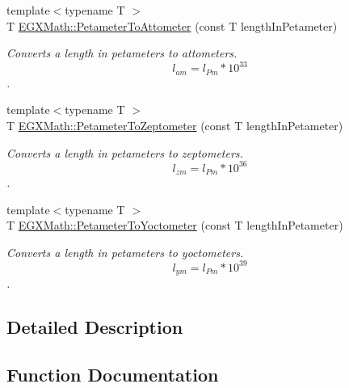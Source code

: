 \begin{DoxyCompactItemize}
{\footnotesize template$<$typename T $>$ }\\T \mbox{\hyperlink{group___e_g_x_math-_conversions-_length_conversions-_petameter-_s_i_ga4803fb5abfc83b6bdb8dce9fffff8fbe}{E\+G\+X\+Math\+::\+Petameter\+To\+Attometer}} (const T length\+In\+Petameter)
\begin{DoxyCompactList}\small\item\em Converts a length in petameters to attometers. \[ l_{am}=l_{Pm} * 10^{33} \]. \end{DoxyCompactList}\item 
{\footnotesize template$<$typename T $>$ }\\T \mbox{\hyperlink{group___e_g_x_math-_conversions-_length_conversions-_petameter-_s_i_ga8c7a1ddfa7557e65e26e65e17a9e3a45}{E\+G\+X\+Math\+::\+Petameter\+To\+Zeptometer}} (const T length\+In\+Petameter)
\begin{DoxyCompactList}\small\item\em Converts a length in petameters to zeptometers. \[ l_{zm}=l_{Pm} * 10^{36} \]. \end{DoxyCompactList}\item 
{\footnotesize template$<$typename T $>$ }\\T \mbox{\hyperlink{group___e_g_x_math-_conversions-_length_conversions-_petameter-_s_i_ga6fd2701bf757e5a6ca26a0d506471433}{E\+G\+X\+Math\+::\+Petameter\+To\+Yoctometer}} (const T length\+In\+Petameter)
\begin{DoxyCompactList}\small\item\em Converts a length in petameters to yoctometers. \[ l_{ym}=l_{Pm} * 10^{39} \]. \end{DoxyCompactList}\end{DoxyCompactItemize}


\subsection{Detailed Description}


\subsection{Function Documentation}
\mbox{\label{group___e_g_x_math-_conversions-_length_conversions-_petameter-_s_i_ga4803fb5abfc83b6bdb8dce9fffff8fbe}} 

